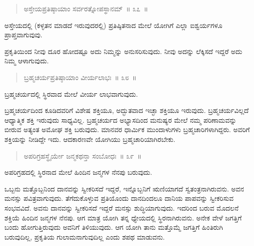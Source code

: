 \vspace{-0.35cm}

\begin{verse}
ಅಸ್ತೇಯಪ್ರತಿಷ್ಠಾಯಾಂ ಸರ್ವರತ್ನೋಪಸ್ಥಾನಮ್​~॥ ೩೭~॥
\end{verse}

\vspace{-0.35cm}

ಅಸ್ತೇಯದಲ್ಲಿ (ಕಳ್ಳತನ ಮಾಡದೆ ಇರುವುದರಲ್ಲಿ) ಪ್ರತಿಷ್ಠಿತನಾದ ಮೇಲೆ ಯೋಗಿಗೆ ಎಲ್ಲಾ ಐಶ್ವರ್ಯಗಳೂ ಪ್ರಾಪ್ತವಾಗುವುವು. 

ಪ್ರಕೃತಿಯಿಂದ ನೀವು ದೂರ ಹೋದಷ್ಟೂ ಅದು ನಿಮ್ಮನ್ನು ಅನುಸರಿಸುವುದು. ನೀವು ಅದನ್ನು ಲೆಕ್ಕಿಸದೆ ಇದ್ದರೆ ಅದು ನಿಮ್ಮ ಆಳಾಗುವುದು. 

\eject

\vspace{-0.35cm}

\begin{verse}
ಬ್ರಹ್ಮಚರ್ಯಪ್ರತಿಷ್ಠಾಯಾಂ ವೀರ್ಯಲಾಭಃ~॥ ೩೮~॥
\end{verse}

\vspace{-0.35cm}

ಬ್ರಹ್ಮಚರ್ಯದಲ್ಲಿ ಸ್ಥಿರವಾದ ಮೇಲೆ ವೀರ್ಯ ಲಾಭವಾಗುವುದು. 

ಬ್ರಹ್ಮಚರ್ಯದಿಂದ ಕೂಡಿದವರಿಗೆ ವಿಶೇಷ ಶಕ್ತಿಯೂ, ಅದ್ಭುತವಾದ ಇಚ್ಛಾ ಶಕ್ತಿಯೂ ಇರುವುದು. ಬ್ರಹ್ಮಚರ್ಯವಿಲ್ಲದೆ ಆಧ್ಯಾತ್ಮಿಕ ಶಕ್ತಿ ಇರುವುದು ಸಾಧ್ಯವಿಲ್ಲ. ಬ್ರಹ್ಮಚರ್ಯದ ಅಭ್ಯಾಸದಿಂದ ಮನುಷ್ಯರ ಮೇಲೆ ನಮ್ಮ ಪರಿಣಾಮವನ್ನು ಬೀರುವ ಅತ್ಯಂತ ಅಮೋಘ ಶಕ್ತಿ ಬರುವುದು. ಮಾನವರ ಧಾರ್ಮಿಕ ಮುಂದಾಳುಗಳು ಬ್ರಹ್ಮಚಾರಿಗಳಾಗಿದ್ದರು. ಅವರಿಗೆ ಶಕ್ತಿಯನ್ನು ನೀಡಿದ್ದೇ ಇದು. ಆದಕಾರಣವೇ ಯೋಗಿಯು ಬ್ರಹ್ಮಚಾರಿಯಾಗಿರಬೇಕು. 

\vspace{-0.35cm}

\begin{verse}
ಅಪರಿಗ್ರಹಸ್ಥೈರ್ಯೇ ಜನ್ಮಕಥನ್ತಾ ಸಂಬೋಧಃ~॥ ೩೯~॥
\end{verse}

\vspace{-0.35cm}

ಅಪರಿಗ್ರಹದಲ್ಲಿ ಸ್ಥಿರನಾದ ಮೇಲೆ ಹಿಂದಿನ ಜನ್ಮಗಳ ನೆನಪು ಬರುವುದು. 

ಒಬ್ಬನು ಮತ್ತೊಬ್ಬನಿಂದ ದಾನವನ್ನು ಸ್ವೀಕರಿಸದೆ ಇದ್ದರೆ, ಇನ್ನೊಬ್ಬನಿಗೆ ಋಣಿಯಾಗದೆ ಸ್ವತಂತ್ರನಾಗಿರುವನು. ಅವನ ಮನಸ್ಸು ಪವಿತ್ರವಾಗುವುದು. ತೆಗೆದುಕೊಳ್ಳುವ ಪ್ರತಿಯೊಂದು ದಾನದಿಂದಲೂ ದಾನಿಯ ಪಾಪವನ್ನು ಸ್ವೀಕರಿಸುವ ಸಂಭವವಿದೆ. ಅವನು ದಾನವನ್ನು ಸ್ವೀಕರಿಸದೆ ಇದ್ದರೆ ಮನಸ್ಸು ಶುದ್ಧಿಯಾಗುವುದು. ಇದರಿಂದ ಬರುವ ಮೊದಲನೆ ಶಕ್ತಿಯೆ ಹಿಂದಿನ ಜನ್ಮಗಳ ನೆನಪು. ಆಗ ಮಾತ್ರ ಯೋಗಿ ತನ್ನ ಧ್ಯೇಯದಲ್ಲಿ ಸ್ಥಿರನಾಗಿರುವನು. ಅನೇಕ ವೇಳೆ ಜಗತ್ತಿಗೆ ಬಂದು ಹೋಗುತ್ತಿರುವುದು ಅವನಿಗೆ ತಿಳಿಯುವುದು. ಆಗ ಯೋಗಿ ತಾನು ಮತ್ತೊಮ್ಮೆ ಜಗತ್ತಿಗೆ ಹಿಂತಿರುಗಿ ಬರುವುದಿಲ್ಲ, ಪ್ರಕೃತಿಯ ಗುಲಾಮನಾಗುವುದಿಲ್ಲ ಎಂದು ಶಪಥ ಮಾಡುವನು. 

\vspace{-0.35cm}

